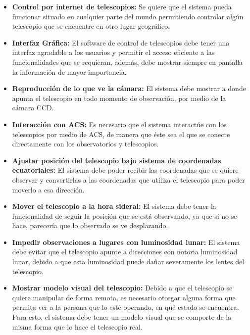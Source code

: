 \documentclass[letterpaper,titlepage,spanish,10pt]{article}
\begin{document}
	\begin{itemize}
	\item \textbf{Control por internet de telescopios:} Se quiere que el sistema 
pueda funcionar situado en cualquier parte del mundo permitiendo controlar alg\'un 
telescopio que se encuentre en otro lugar geogr\'afico.

	\item \textbf{Interfaz Gr\'afica:} El software de control de telescopios debe 
tener una interfaz agradable a los usuarios y permitir el acceso eficiente a las 
funcionalidades que se requieran, adem\'as, debe mostrar siempre en pantalla la 
informaci\'on de mayor importancia.

	\item \textbf{Reproducci\'on de lo que ve la c\'amara:} El sistema debe 
mostrar a donde apunta el telescopio en todo momento de observaci\'on, por medio de 
la c\'amara CCD.

	\item \textbf{Interacci\'on con ACS:} Es necesario que el sistema interact\'ue con 
los telescopios por medio de ACS, de manera que \'este sea el que se conecte 
directamente con los observatorios y telescopios.

	\item \textbf{Ajustar posici\'on del telescopio bajo sistema de coordenadas 
ecuatoriales:} El sistema debe poder recibir las coordenadas que se quiere observar 
y convertirlas a las coordenadas que utiliza el telescopio para poder moverlo a esa 
direcci\'on.

	\item \textbf{Mover el telescopio a la hora sideral:} El sistema debe tener la 
funcionalidad de seguir la posici\'on que se est\'a observando, ya que si no se 
hace, parecer\'ia que lo observado se ve desplazando.

	\item \textbf{Impedir observaciones a lugares con luminosidad lunar:} El sistema 
debe evitar que el telescopio apunte a direcciones con notoria luminosidad lunar, 
debido a que esta luminosidad puede da\~nar severamente los lentes del telescopio.

	\item \textbf{Mostrar modelo visual del telescopio:} Debido a que el telescopio se 
quiere manipular de forma remota, es necesario otorgar alguna forma que permita 
ver a la persona que lo est\'e operando, en qu\'e estado se encuentra. Para esto, 
el sistema debe tener un modelo visual que se comporte de la misma forma que lo 
hace el telescopio real.


\end{itemize}
\end{document}
